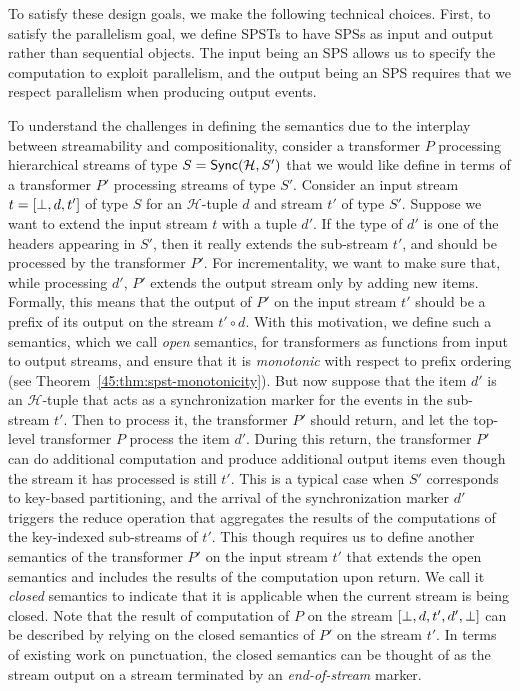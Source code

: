 To satisfy these design goals, we make the following technical choices.
First, to satisfy the parallelism goal, we define SPSTs to have SPSs as input and output rather than sequential objects.
The input being an SPS allows us to specify the computation to exploit parallelism,
and the output being an SPS requires that we respect parallelism when producing output events.

To understand  the challenges in defining the semantics due to the interplay between streamability and compositionality, consider a transformer $P$ processing
hierarchical streams of type  $S=\mathsf{Sync}({\mathcal{H}}, S')$ that we would like
define in terms of a transformer $P'$ processing streams of type $S'$.
Consider an input stream $t=[\bot, d, t']$ of type $S$ for an $\mathcal{H}$-tuple $d$ and
stream $t'$ of type $S'$. Suppose we want to extend the input stream $t$ with
a tuple $d'$. If the type of $d'$ is one of the headers appearing in $S'$, then
it really extends the sub-stream $t'$, and should be processed by the transformer $P'$.
For incrementality, we want to make sure that, while processing $d'$, $P'$ extends the output stream only
by adding new items. Formally, this means that the output of $P'$ on the input
stream $t'$ should be a prefix of its output on the stream $t'\circ d$.
With this motivation, we define such a semantics, which we call \emph{open} semantics,
for transformers as functions from input to output streams, and ensure that it is \emph{monotonic}
 with respect to prefix ordering
(see Theorem~\ref{45:thm:spst-monotonicity}).
But now suppose that the item $d'$ is an ${\mathcal H}$-tuple
that acts as a synchronization marker for the events in the sub-stream $t'$.
Then to process it, the transformer $P'$ should return, and let the top-level
transformer $P$ process the item $d'$.
During this return, the transformer $P'$ can do additional computation and produce
additional output items even though the stream it has processed is still $t'$.
This is a typical case when $S'$ corresponds to key-based partitioning,
and the arrival of the synchronization marker $d'$ triggers the reduce operation
that aggregates the results of the computations of the key-indexed sub-streams of $t'$.
This though requires us to define another semantics of the transformer $P'$ on
the input stream $t'$ that extends the open semantics and includes the results
of the computation upon return. We call it \emph{closed} semantics to indicate
that it is applicable when the current stream  is being closed.
Note that the result of computation of $P$ on the stream $[\bot, d,t',d', \bot]$ can be
described by relying on the closed semantics of $P'$ on the stream $t'$.
In terms of existing work on punctuation,
the closed semantics can be thought of as the stream output on
a stream terminated by an \emph{end-of-stream} marker.

